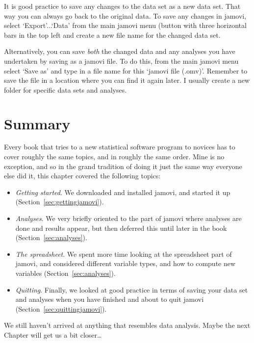 It is good practice to save any changes to the data set as a new data set. That way you can always go back to the original data. To save any changes in jamovi, select `Export'...`Data' from the main jamovi menu (button with three horizontal bars in the top left and create a new file name for the changed data set.

Alternatively, you can save {\it both} the changed data and any analyses you have undertaken by saving as a jamovi file. To do this, from the main jamovi menu select `Save as' and type in a file name for this `jamovi file (.omv)'. Remember to save the file in a location where you can find it again later. I usually create a new folder for specific data sets and analyses.  


\section{Summary}

Every book that tries to a new statistical software program to novices has to cover roughly the same topics, and in roughly the same order. Mine is no exception, and so in the grand tradition of doing it just the same way everyone else did it, this chapter covered the following topics:

\begin{itemize}
\item {\it Getting started}. We downloaded and installed jamovi, and started it up (Section~\ref{sec:gettingjamovi}).
\item {\it Analyses}. We very briefly oriented to the part of jamovi where analyses are done and results appear, but then deferred this until later in the book (Section~\ref{sec:analyses}).
\item {\it The spreadsheet}. We spent more time looking at the spreadsheet part of jamovi, and considered different variable types, and how to compute new variables (Section~\ref{sec:analyses}).
\item {\it Quitting}. Finally, we looked at good practice in terms of saving your data set and analyses when you have finished and about to quit jamovi (Section~\ref{sec:quittingjamovi}).

\end{itemize}

\noindent
We still haven't arrived at anything that resembles data analysis. Maybe the next Chapter will get us a bit closer\ldots



